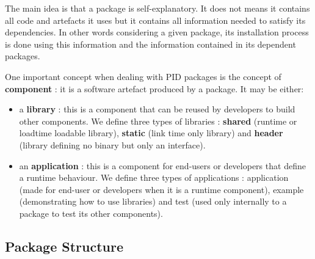 \documentclass[12pt,a4paper]{article}
\begin{document}
The main idea is that a package is self-explanatory. It does not means it contains all code and artefacts it uses but it contains all information needed to satisfy its dependencies. In other words considering a given package, its installation process is done using this information and the information contained in its dependent packages.

One important concept when dealing with PID packages is the concept of \textbf{component} : it is a software artefact produced  by a package. It may be either:
\begin{itemize}
\item a \textbf{library} : this is a component that can be reused by developers to build other components. We define three types of libraries : \textbf{shared} (runtime or loadtime loadable library), \textbf{static} (link time only library) and \textbf{header} (library defining no binary but only an interface).
\item an \textbf{application} : this is a component for end-users or developers that define a runtime behaviour. We define three types of applications : application (made for end-user or developers when it is a runtime component), example (demonstrating how to use libraries) and test (used only internally to a package to test its other components).
\end{itemize}

\pagebreak

\subsection{Package Structure}
\label{sec:PackageStruct}
\end{document}
